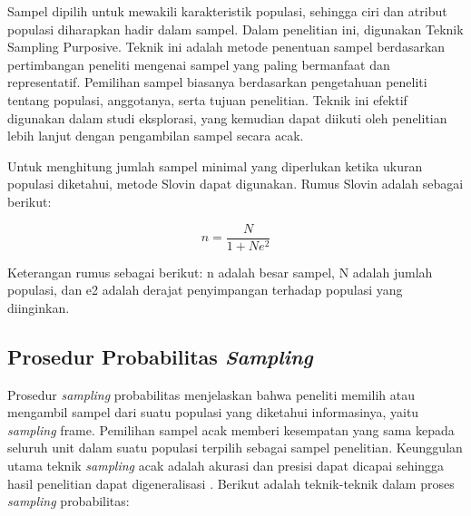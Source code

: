 Sampel dipilih untuk mewakili karakteristik populasi, sehingga ciri dan atribut populasi diharapkan hadir dalam sampel. Dalam penelitian ini, digunakan Teknik Sampling Purposive. Teknik ini adalah metode penentuan sampel berdasarkan pertimbangan peneliti mengenai sampel yang paling bermanfaat dan representatif. Pemilihan sampel biasanya berdasarkan pengetahuan peneliti tentang populasi, anggotanya, serta tujuan penelitian. Teknik ini efektif digunakan dalam studi eksplorasi, yang kemudian dapat diikuti oleh penelitian lebih lanjut dengan pengambilan sampel secara acak.

Untuk menghitung jumlah sampel minimal yang diperlukan ketika ukuran populasi diketahui, metode Slovin dapat digunakan. Rumus Slovin adalah sebagai berikut:

\[n = \frac{N}{1 + Ne^2}\] \newline


Keterangan rumus sebagai berikut: n adalah besar sampel, N adalah jumlah populasi, dan e2 adalah derajat penyimpangan terhadap populasi yang diinginkan.

\subsection{Prosedur Probabilitas \textit{Sampling}}
Prosedur \textit{sampling} probabilitas menjelaskan bahwa peneliti memilih atau mengambil sampel dari suatu populasi yang diketahui informasinya, yaitu \textit{sampling} frame. Pemilihan sampel acak memberi kesempatan yang sama kepada seluruh unit dalam suatu populasi terpilih sebagai sampel penelitian. Keunggulan utama teknik \textit{sampling} acak adalah akurasi dan presisi dapat dicapai sehingga hasil penelitian dapat digeneralisasi \cite{budijanto2013populasi}. Berikut adalah teknik-teknik dalam proses \textit{sampling} probabilitas: 

